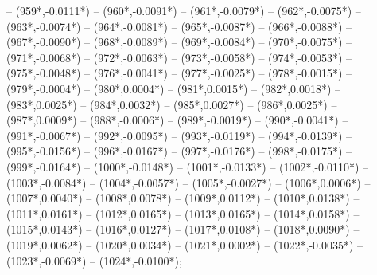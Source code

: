 {		-- ({959*\dx},{-0.0111*\dy})
		-- ({960*\dx},{-0.0091*\dy})
		-- ({961*\dx},{-0.0079*\dy})
		-- ({962*\dx},{-0.0075*\dy})
		-- ({963*\dx},{-0.0074*\dy})
		-- ({964*\dx},{-0.0081*\dy})
		-- ({965*\dx},{-0.0087*\dy})
		-- ({966*\dx},{-0.0088*\dy})
		-- ({967*\dx},{-0.0090*\dy})
		-- ({968*\dx},{-0.0089*\dy})
		-- ({969*\dx},{-0.0084*\dy})
		-- ({970*\dx},{-0.0075*\dy})
		-- ({971*\dx},{-0.0068*\dy})
		-- ({972*\dx},{-0.0063*\dy})
		-- ({973*\dx},{-0.0058*\dy})
		-- ({974*\dx},{-0.0053*\dy})
		-- ({975*\dx},{-0.0048*\dy})
		-- ({976*\dx},{-0.0041*\dy})
		-- ({977*\dx},{-0.0025*\dy})
		-- ({978*\dx},{-0.0015*\dy})
		-- ({979*\dx},{-0.0004*\dy})
		-- ({980*\dx},{0.0004*\dy})
		-- ({981*\dx},{0.0015*\dy})
		-- ({982*\dx},{0.0018*\dy})
		-- ({983*\dx},{0.0025*\dy})
		-- ({984*\dx},{0.0032*\dy})
		-- ({985*\dx},{0.0027*\dy})
		-- ({986*\dx},{0.0025*\dy})
		-- ({987*\dx},{0.0009*\dy})
		-- ({988*\dx},{-0.0006*\dy})
		-- ({989*\dx},{-0.0019*\dy})
		-- ({990*\dx},{-0.0041*\dy})
		-- ({991*\dx},{-0.0067*\dy})
		-- ({992*\dx},{-0.0095*\dy})
		-- ({993*\dx},{-0.0119*\dy})
		-- ({994*\dx},{-0.0139*\dy})
		-- ({995*\dx},{-0.0156*\dy})
		-- ({996*\dx},{-0.0167*\dy})
		-- ({997*\dx},{-0.0176*\dy})
		-- ({998*\dx},{-0.0175*\dy})
		-- ({999*\dx},{-0.0164*\dy})
		-- ({1000*\dx},{-0.0148*\dy})
		-- ({1001*\dx},{-0.0133*\dy})
		-- ({1002*\dx},{-0.0110*\dy})
		-- ({1003*\dx},{-0.0084*\dy})
		-- ({1004*\dx},{-0.0057*\dy})
		-- ({1005*\dx},{-0.0027*\dy})
		-- ({1006*\dx},{0.0006*\dy})
		-- ({1007*\dx},{0.0040*\dy})
		-- ({1008*\dx},{0.0078*\dy})
		-- ({1009*\dx},{0.0112*\dy})
		-- ({1010*\dx},{0.0138*\dy})
		-- ({1011*\dx},{0.0161*\dy})
		-- ({1012*\dx},{0.0165*\dy})
		-- ({1013*\dx},{0.0165*\dy})
		-- ({1014*\dx},{0.0158*\dy})
		-- ({1015*\dx},{0.0143*\dy})
		-- ({1016*\dx},{0.0127*\dy})
		-- ({1017*\dx},{0.0108*\dy})
		-- ({1018*\dx},{0.0090*\dy})
		-- ({1019*\dx},{0.0062*\dy})
		-- ({1020*\dx},{0.0034*\dy})
		-- ({1021*\dx},{0.0002*\dy})
		-- ({1022*\dx},{-0.0035*\dy})
		-- ({1023*\dx},{-0.0069*\dy})
		-- ({1024*\dx},{-0.0100*\dy});
	}
